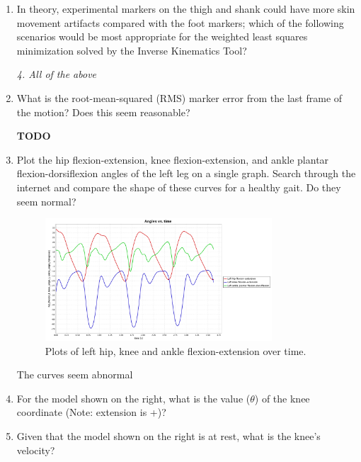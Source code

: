\documentclass[11pt]{article}
\begin{document}
\begin{enumerate}
\begin{adjustwidth}{0.5cm}{}
\begin{center}
        \end{center}
        The \textit{B} pose-marker combination yields the smallest error.
    \end{adjustwidth}
    \item In theory, experimental markers on the thigh and shank could have more skin movement artifacts compared with the foot markers; which of the following scenarios would be most appropriate for the weighted least squares minimization solved by the Inverse Kinematics Tool?
    \begin{adjustwidth}{0.5cm}{}
        \textit{4. All of the above}
    \end{adjustwidth}
    \item What is the root-mean-squared (RMS) marker error from the last frame of the motion? Does this seem reasonable?
    \begin{adjustwidth}{0.5cm}{}
        \textbf{TODO}
    \end{adjustwidth}
    \item Plot the hip flexion-extension, knee flexion-extension, and ankle plantar flexion-dorsiflexion angles of the left leg on a single graph. Search through the internet and compare the shape of these curves for a healthy gait. Do they seem normal?
    \begin{adjustwidth}{0.5cm}{}
        \begin{figure}[h!]
            \centering
            \includegraphics[width=0.8\textwidth]{screens/flexion_extension.jpg}
            \caption{Plots of left hip, knee and ankle flexion-extension over time.}
        \end{figure}
        The curves seem abnormal
    \end{adjustwidth}
    \item For the model shown on the right, what is the value ($\theta$) of the knee coordinate (Note: extension is +)?
    \item Given that the model shown on the right is at rest, what is the knee's velocity?

\end{enumerate}
\end{document}

